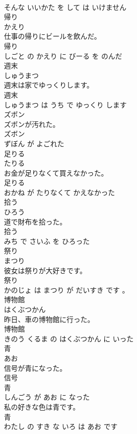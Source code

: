 \documentclass[8pt]{extreport}
\begin{document}
\begin{CJK}{UTF8}{min}
\\	そんな いいかた を して は いけません			
\\	帰り	
\\	かえり			
\\	仕事の帰りにビールを飲んだ。	
\\	帰り 
\\	しごと の かえり に びーる を のんだ			
\\	週末	
\\	しゅうまつ			
\\	週末は家でゆっくりします。	
\\	週末 
\\	しゅうまつ は うち で ゆっくり します			
\\	ズボン	
\\	ズボンが汚れた。	
\\	ズボン 
\\	ずぼん が よごれた			
\\	足りる	
\\	たりる			
\\	お金が足りなくて買えなかった。	
\\	足りる 
\\	おかね が たりなくて かえなかった			
\\	拾う	
\\	ひろう			
\\	道で財布を拾った。	
\\	拾う 
\\	みち で さいふ を ひろった			
\\	祭り	
\\	まつり			
\\	彼女は祭りが大好きです。	
\\	祭り 
\\	かのじょ は まつり が だいすき です 。			
\\	博物館	
\\	はくぶつかん			
\\	昨日、車の博物館に行った。	
\\	博物館 
\\	きのう くるま の はくぶつかん に いった			
\\	青	
\\	あお			
\\	信号が青になった。	
\\	信号 
\\	青 
\\	しんごう が あお に なった			
\\	私の好きな色は青です。	
\\	青 
\\	わたし の すき な いろ は あお です			

\end{CJK}
\end{document}
